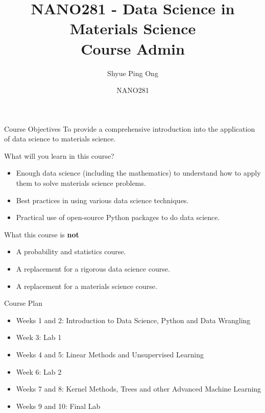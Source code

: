 \documentclass[aspectratio=169]{beamer}
\title[NANO281 Course Admin]{NANO281 - Data Science in Materials Science\\Course Admin}
\author{Shyue Ping Ong}
\institute[UCSD]{University of California, San Diego\\
\medskip
}
\date{NANO281} %
\begin{document}
\begin{frame}
    \titlepage %
\end{frame}


\begin{frame}{Course Objectives}
\huge{To provide a comprehensive introduction into the application of data science to materials science.}
\end{frame}


\begin{frame}{What will you learn in this course?}
    \begin{itemize}
        \item Enough data science (including the mathematics) to understand how to apply them to solve materials science problems.
        \item Best practices in using various data science techniques.
        \item Practical use of open-source Python packages to do data science.
    \end{itemize}
\end{frame}


\begin{frame}{What this course is \textbf{not}}
    \begin{itemize}
        \item A probability and statistics course.
        \item A replacement for a rigorous data science course.
        \item A replacement for a materials science course.
    \end{itemize}
\end{frame}


\begin{frame}{Course Plan}
    \begin{itemize}
        \item Weeks 1 and 2: Introduction to Data Science, Python and Data Wrangling
        \item Week 3: Lab 1
        \item Weeks 4 and 5: Linear Methods and Unsupervised Learning
        \item Week 6: Lab 2
        \item Weeks 7 and 8: Kernel Methods, Trees and other Advanced Machine Learning
        \item Weeks 9 and 10: Final Lab
    \end{itemize}
\end{frame}
\end{document}
